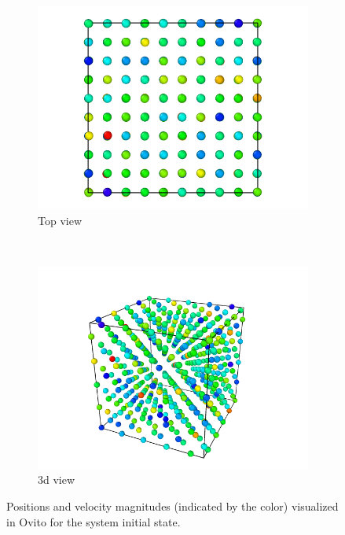 \documentclass[10pt,showpacs,preprintnumbers,footinbib,amsmath,amssymb,aps,prl,twocolumn,groupedaddress,superscriptaddress,showkeys]{revtex4-1}
\begin{document}
\begin{figure}
\centering
	\begin{subfigure}[b]{0.5\textwidth}
	\centering
		\includegraphics[width=\textwidth]{figures/Init300Kxy.png}
		\caption{Top view}
		\label{fig:init300kxy}
	\end{subfigure}
\\
	\begin{subfigure}[b]{0.5\textwidth}
	\centering
		\includegraphics[width=\textwidth]{figures/Init300K3d.png}
		\caption{3d view}
		\label{fig:init300k3d}
	\end{subfigure}
	\caption{Positions and velocity magnitudes (indicated by the color)
	visualized in Ovito for the system initial state.}
	\label{fig:init300K}
\end{figure}
\end{document}
